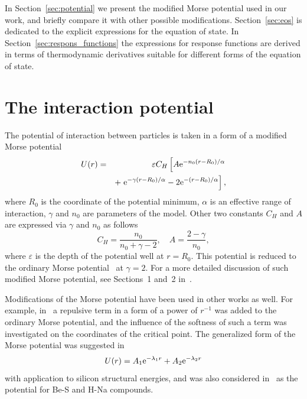 In Section~\ref{sec:potential} we present the modified Morse potential used in our work, and briefly compare it with other possible modifications. Section~\ref{sec:eos} is dedicated to the explicit expressions for the equation of state. In Section~\ref{sec:respons_functions} the expressions for response functions are derived in terms of thermodynamic derivatives suitable for different forms of the equation of state.


\section{\label{sec:potential}The interaction potential}
The potential of interaction between particles is taken in a form of a modified Morse potential
\begin{eqnarray}
	\label{def:mod_morse}
	U(r) & = & \varepsilon C_{H} \left[A {\rm e}^{-n_0(r-R_0)/\alpha} \right.
	\nonumber\\
	&& + \left. {\rm e}^{-\gamma(r - R_0)/\alpha} -2{\rm e}^{-(r-R_0)/\alpha}\right],
\end{eqnarray}
where $R_0$ is the coordinate of the potential minimum, $\alpha$ is an effective range of interaction, $\gamma$ and $n_0$ are parameters of the model. Other two constants $C_{H}$ and $A$ are expressed via $\gamma$ and $n_0$ as follows
\begin{equation}
	C_{H} = \frac{n_0}{n_0 + \gamma - 2}, \quad A = \frac{2 - \gamma}{n_0},
\end{equation}
where $\varepsilon$ is the depth of the potential well at $r=R_0$. This potential is reduced to the ordinary Morse potential~\cite{Morse1929} at $\gamma=2$. For a more detailed discussion of such modified Morse potential, see Sections~1 and~2 in~\cite{KozlovskiiDobush2020}.

Modifications of the Morse potential have been used in other works as well. For example, in~\cite{MartinezValenciaEtAl2013} a repulsive term in a form of a power of $r^{-1}$ was added to the ordinary Morse potential, and the influence of the softness of such a term was investigated on the coordinates of the critical point. The generalized form of the Morse potential was suggested in~\cite{BiswasHamann1985}
\begin{equation}
	U(r) = A_1 {\rm e}^{-\lambda_1 r} + A_2 {\rm e}^{-\lambda_2 r}
\end{equation} 
with application to silicon structural energies, and was also considered in~\cite{Lim2005} as the potential for Be-S and H-Na compounds.

